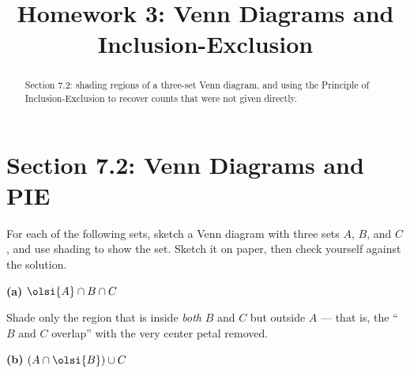\documentclass[12pt]{ximera}
\title{Homework 3: Venn Diagrams and Inclusion-Exclusion}
\begin{document}
\begin{abstract}
Section 7.2: shading regions of a three-set Venn diagram, and using the Principle of
Inclusion-Exclusion to recover counts that were not given directly.
\end{abstract}
\maketitle

\section*{Section 7.2: Venn Diagrams and PIE}

\begin{problem}
For each of the following sets, sketch a Venn diagram with three sets $A$, $B$, and
$C$, and use shading to show the set. Sketch it on paper, then check yourself
against the solution.

\begin{prompt}
\textbf{(a)} $\olsi{A}\cap B\cap C$

\begin{freeResponse}
\end{freeResponse}

\begin{feedback}
Shade only the region that is inside \emph{both} $B$ and $C$ but outside $A$ ---
that is, the ``$B$ and $C$ overlap'' with the very center petal removed.
\begin{center}
\end{center}
\end{feedback}
\end{prompt}

\begin{prompt}
\textbf{(b)} $\left(A\cap\olsi{B}\right)\cup C$

\begin{freeResponse}
\end{freeResponse}


\end{prompt}
\end{problem}
\end{document}
